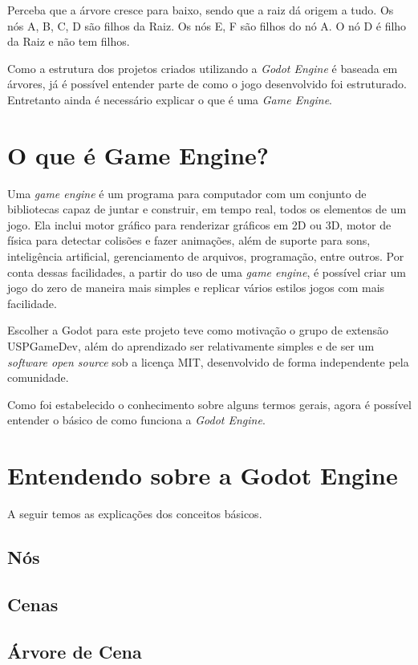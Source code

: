 Perceba que a árvore cresce para baixo, sendo que a raiz dá origem a tudo.
Os nós A, B, C, D são filhos da Raiz. Os nós E, F são filhos do nó A. O nó
D é filho da Raiz e não tem filhos.

Como a estrutura dos projetos criados utilizando a \textit{Godot Engine} é 
baseada em árvores, já é possível entender parte de como o jogo desenvolvido foi 
estruturado. Entretanto ainda é necessário explicar o que é uma 
\textit{Game Engine}.


\section{O que é Game Engine?}

Uma \textit{game engine} é um programa para computador com um conjunto de 
bibliotecas capaz de juntar e construir, em tempo real, todos os elementos de um
jogo.
Ela inclui motor gráfico para renderizar gráficos em 2D ou 3D, motor de física 
para detectar colisões e fazer animações, além de suporte para sons, 
inteligência artificial, gerenciamento de arquivos, programação, entre outros.
Por conta dessas facilidades, a partir do uso de uma \textit{game engine}, é 
possível criar um jogo do zero de maneira mais simples e replicar vários estilos
jogos com mais facilidade.

Escolher a Godot para este projeto teve como motivação o grupo de extensão 
USPGameDev, além do aprendizado ser relativamente simples e de ser um 
\textit{software open source} sob a licença MIT, desenvolvido de forma 
independente pela comunidade.

Como foi estabelecido o conhecimento sobre alguns termos gerais, agora é
possível entender o básico de como funciona a \textit{Godot Engine}.

\section{Entendendo sobre a Godot Engine}

A seguir temos as explicações dos conceitos básicos.

\subsection{Nós}
\subsection{Cenas}
\subsection{Árvore de Cena}
